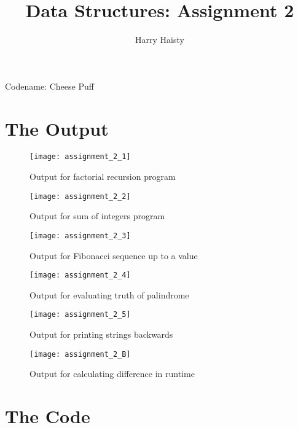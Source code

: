 \documentclass[11pt]{article}
\title{Data Structures: Assignment 2}
\author{Harry Haisty}
\begin{document}
\maketitle
\centerline{Codename: Cheese Puff}

\section*{The Output}
\begin{figure}[H]
    \centering
    \texttt{[image: assignment\_2\_1]}
    \caption{Output for factorial recursion program}
    \label{fig:part 1}
\end{figure}

\begin{figure}[H]
    \centering
    \texttt{[image: assignment\_2\_2]}
    \caption{Output for sum of integers program}
    \label{fig:part 2}
\end{figure}

\begin{figure}[H]
    \centering
    \texttt{[image: assignment\_2\_3]}
    \caption{Output for Fibonacci sequence up to a value}
    \label{fig:part 3}
\end{figure}

\begin{figure}[H]
    \centering
    \texttt{[image: assignment\_2\_4]}
    \caption{Output for evaluating truth of palindrome}
    \label{fig:part 4}
\end{figure}

\begin{figure}[H]
    \centering
    \texttt{[image: assignment\_2\_5]}
    \caption{Output for printing strings backwards}
    \label{fig:part 5}
\end{figure}

\begin{figure}[H]
    \centering
    \texttt{[image: assignment\_2\_B]}
    \caption{Output for calculating difference in runtime}
    \label{fig:part 6}
\end{figure}


\section*{The Code}
\end{document}
